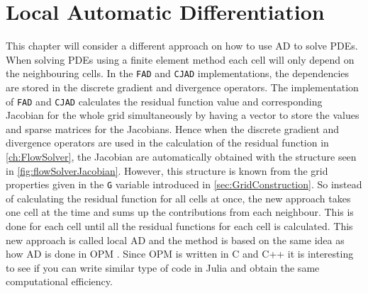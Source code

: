 \chapter{Local Automatic Differentiation}
\label{ch:LocalAD}
This chapter will consider a different approach on how to use AD to solve PDEs. When solving PDEs using a finite element method each cell will only depend on the neighbouring cells. In the \texttt{FAD} and \texttt{CJAD} implementations, the dependencies are stored in the discrete gradient and divergence operators. The implementation of \texttt{FAD} and \texttt{CJAD} calculates the residual function value and corresponding Jacobian for the whole grid simultaneously by having a vector to store the values and sparse matrices for the Jacobians. Hence when the discrete gradient and divergence operators are used in the calculation of the residual function in \autoref{ch:FlowSolver}, the Jacobian are automatically obtained with the structure seen in \autoref{fig:flowSolverJacobian}. However, this structure is known from the grid properties given in the \texttt{G} variable introduced in \autoref{sec:GridConstruction}. So instead of calculating the residual function for all cells at once, the new approach takes one cell at the time and sums up the contributions from each neighbour. This is done for each cell until all the residual functions for each cell is calculated. This new approach is called local AD and the method is based on the same idea as how AD is done in OPM \emph{\citep{OPM}}. Since OPM is written in C and C++ it is interesting to see if you can write similar type of code in Julia and obtain the same computational efficiency. 


